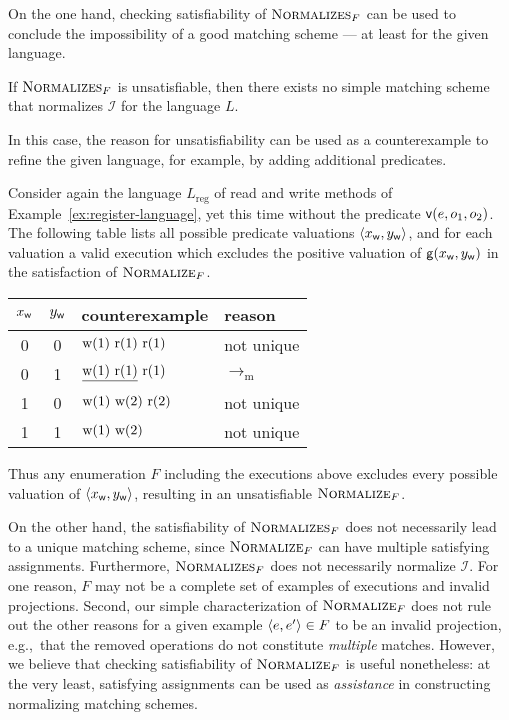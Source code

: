 On the one hand, checking satisfiability of $\textsc{Normalizes}_F$ can be used
to conclude the impossibility of a good matching scheme — at least for the
given language.

\begin{lemma}

  If $\textsc{Normalizes}_F$ is unsatisfiable, then there exists no simple
  matching scheme that normalizes $\mathcal{I}$ for the language $L$.

\end{lemma}

In this case, the reason for unsatisfiability can be used as a counterexample
to refine the given language, for example, by adding additional predicates.

\begin{example}

  Consider again the language $L_\mathrm{reg}$ of read and write methods of
  Example~\ref{ex:register-language}, yet this time without the predicate ${\sf
  v}(e,o_1,o_2)$. The following table lists all possible predicate valuations
  ${\left\langle{x_{\sf w}, y_{\sf w}}\right\rangle}$, and for each valuation a valid execution which
  excludes the positive valuation of ${\sf g}(x_{\sf w}, y_{\sf w})$ in the
  satisfaction of $\textsc{Normalize}_F$.
  \begin{center}
    \begin{tabular}{cc|ll}
      $x_{\sf w}$ & $y_{\sf w}$ & counterexample & reason \\
      \hline
      0 & 0 & ${\rm w}(1)\ {\rm r}(1)\ {\rm r}(1)$ & not unique \\
      0 & 1 & $\underline{{\rm w}(1)\ {\rm r}(1)}\ {\rm r}(1)$ & $\to_\mathrm{m}$ \\
      1 & 0 & ${\rm w}(1)\ {\rm w}(2)\ {\rm r}(2)$ & not unique \\
      1 & 1 & ${\rm w}(1)\ {\rm w}(2)$ & not unique \\
    \end{tabular}
  \end{center}
  Thus any enumeration $F$ including the executions above excludes every
  possible valuation of ${\left\langle{x_{\sf w}, y_{\sf w}}\right\rangle}$, resulting in an
  unsatisfiable $\textsc{Normalize}_F$.

\end{example}

On the other hand, the satisfiability of $\textsc{Normalizes}_F$ does not
necessarily lead to a unique matching scheme, since $\textsc{Normalize}_F$ can
have multiple satisfying assignments. Furthermore, $\textsc{Normalizes}_F$ does
not necessarily normalize $\mathcal{I}$. For one reason, $F$ may not be a
complete set of examples of executions and invalid projections. Second, our
simple characterization of $\textsc{Normalize}_F$ does not rule out the other
reasons for a given example ${\left\langle{e,e'}\right\rangle} \in F$ to be an invalid projection,
e.g.,~that the removed operations do not constitute \emph{multiple} matches.
However, we believe that checking satisfiability of $\textsc{Normalize}_F$ is
useful nonetheless: at the very least, satisfying assignments can be used as
\emph{assistance} in constructing normalizing matching schemes.
